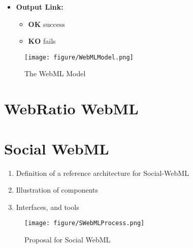 \documentclass[a4paper]{memoir}
\begin{document}
\begin{enumerate}
\begin{enumerate}
\begin{itemize}
\begin{itemize}
				\end{itemize}
				\item \textbf{Output Link:}
				\begin{itemize}
					\item \textbf{OK} success
					\item \textbf{KO} fails
				\end{itemize}
			\end{itemize}
				\begin{figure}[here]
					\texttt{[image: figure/WebMLModel.png]}
					\caption{The WebML Model}
					\label{fig:WebML_Model}
				\end{figure}
		\end{enumerate}
	\end{enumerate}

	



	\section{WebRatio WebML}
	
	
	
\section{Social WebML} %
\label{sect:Social WebML}
	\begin{enumerate}
		\item Definition of a reference architecture for Social-WebML
		\item Illustration of components
		\item Interfaces, and tools
	\end{enumerate}
  
	\pagebreak
	\begin{figure}[here]
	\texttt{[image: figure/SWebMLProcess.png]}
	\caption{Proposal for Social WebML}
	\label{fig:SocialWebML}
	\end{figure}
	
\end{document}
